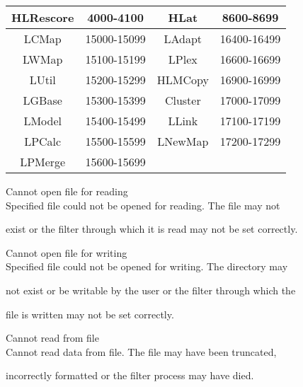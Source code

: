 \begin{itemize}
\begin{center}
\begin{tabular}{|c|c|c|c|}
HLRescore& 4000-4100     & HLat          & 8600-8699    \\


\hline


LCMap    & 15000-15099   & LAdapt        & 16400-16499  \\


LWMap    & 15100-15199   & LPlex         & 16600-16699  \\


LUtil    & 15200-15299   & HLMCopy       & 16900-16999  \\


LGBase   & 15300-15399   & Cluster       & 17000-17099  \\


LModel   & 15400-15499   & LLink         & 17100-17199  \\


LPCalc   & 15500-15599   & LNewMap       & 17200-17299  \\


LPMerge  & 15600-15699   &               &              \\


\hline


\end{tabular}


\end{center}





 Cannot open file for reading \\


        Specified file could not be opened for reading.  The file may not


        exist or the filter through which it is read may not be set correctly.


 Cannot open file for writing \\


        Specified file could not be opened for writing.  The directory may


        not exist or be writable by the user or the filter through which the


        file is written may not be set correctly.


 Cannot read from file \\


        Cannot read data from file.  The file may have been truncated,  


        incorrectly formatted or the filter process may have died.



\end{itemize}
